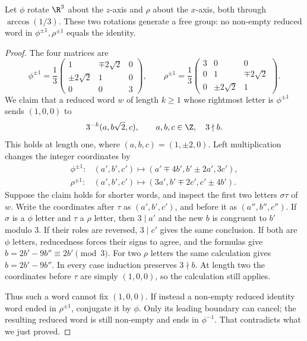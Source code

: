 \begin{lemma}[Hausdorff, 1914]\label{lem:freerot}
Let $\phi$ rotate $\R^3$ about the $z$-axis and $\rho$ about the $x$-axis, both through $\arccos(1/3)$. These two rotations generate a free group: no non-empty reduced word in $\phi^{\pm1},\rho^{\pm1}$ equals the identity.
\end{lemma}
\begin{proof}
The four matrices are
\[\phi^{\pm1}=\frac13\begin{pmatrix}1&\mp2\sqrt2&0\\\pm2\sqrt2&1&0\\0&0&3\end{pmatrix},\qquad
\rho^{\pm1}=\frac13\begin{pmatrix}3&0&0\\0&1&\mp2\sqrt2\\0&\pm2\sqrt2&1\end{pmatrix}.\]
We claim that a reduced word $w$ of length $k\ge1$ whose rightmost letter is $\phi^{\pm1}$ sends $(1,0,0)$ to
\[3^{-k}(a,b\sqrt2,c),\qquad a,b,c\in\Z,\quad 3\nmid b.\]
This holds at length one, where $(a,b,c)=(1,\pm2,0)$. Left multiplication changes the integer coordinates by
\[\begin{aligned}
\phi^{\pm1}:&(a',b',c')\mapsto(a'\mp4b',b'\pm2a',3c'),\\
\rho^{\pm1}:&(a',b',c')\mapsto(3a',b'\mp2c',c'\pm4b').
\end{aligned}\]
Suppose the claim holds for shorter words, and inspect the first two letters $\sigma\tau$ of $w$. Write the coordinates after $\tau$ as $(a',b',c')$, and before it as $(a'',b'',c'')$. If $\sigma$ is a $\phi$ letter and $\tau$ a $\rho$ letter, then $3\mid a'$ and the new $b$ is congruent to $b'$ modulo $3$. If their roles are reversed, $3\mid c'$ gives the same conclusion. If both are $\phi$ letters, reducedness forces their signs to agree, and the formulas give $b=2b'-9b''\equiv2b'\pmod3$. For two $\rho$ letters the same calculation gives $b=2b'-9b''$. In every case induction preserves $3\nmid b$. At length two the coordinates before $\tau$ are simply $(1,0,0)$, so the calculation still applies.

Thus such a word cannot fix $(1,0,0)$. If instead a non-empty reduced identity word ended in $\rho^{\pm1}$, conjugate it by $\phi$. Only its leading boundary can cancel; the resulting reduced word is still non-empty and ends in $\phi^{-1}$. That contradicts what we just proved.
\end{proof}

